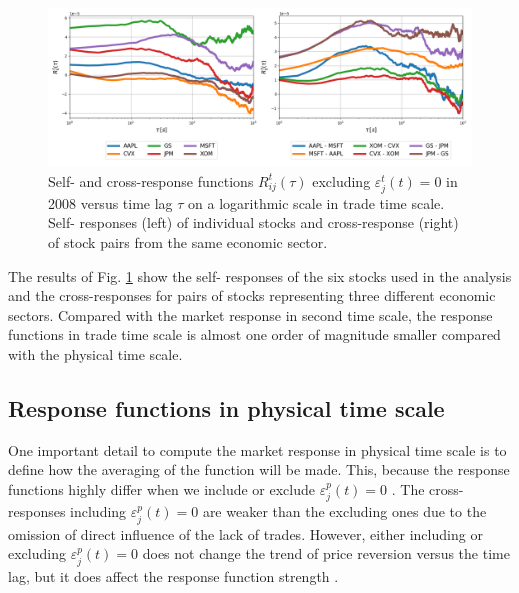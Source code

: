 \begin{figure}[htbp]
    \centering
    \includegraphics[width=\textwidth]
    {figures/03_responses_trade_scale_2008.png}
    \caption{Self- and cross-response functions
             $R^{t}_{ij}\left(\tau\right)$ excluding
             $\varepsilon^{t}_{j}\left(t\right) = 0$ in 2008 versus time
             lag $\tau$ on a logarithmic scale in trade time scale. Self-
             responses (left) of individual stocks and cross-response (right)
             of stock pairs from the same economic sector.}
    \label{fig:response_function_trade_scale}
\end{figure}

The results of Fig. \ref{fig:response_function_trade_scale} show the self-
responses of the six stocks used in the analysis and the cross-responses for
pairs of stocks representing three different economic sectors. Compared with
the market response in second time scale, the response functions in trade time
scale is almost one order of magnitude smaller compared with the physical time
scale.

\subsection{Response functions in physical time scale}
\label{subsec:response_function_physical}

One important detail to compute the market response in physical time scale is
to define how the averaging of the function will be made. This, because the
response functions highly differ when we include or exclude
$\varepsilon^{p}_j \left( t\right) = 0$ \cite{Wang_2016_cross}. The
cross-responses including $\varepsilon^{p}_j \left( t\right) = 0$ are weaker
than the excluding ones due to the omission of direct influence of the lack of
trades. However, either including or excluding
$\varepsilon^{p}_j \left( t\right) = 0$ does not change the trend of price
reversion versus the time lag, but it does affect the response function
strength \cite{Wang_2016_avg}.


